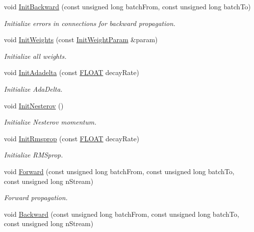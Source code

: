 \begin{DoxyCompactItemize}
void \hyperlink{classfractal_1_1Rnn_a7b6cce657b3a765903d4f90076555e5b}{Init\+Backward} (const unsigned long batch\+From, const unsigned long batch\+To)
\begin{DoxyCompactList}\small\item\em Initialize errors in connections for backward propagation. \end{DoxyCompactList}\item 
void \hyperlink{classfractal_1_1Rnn_afa174b5308bcc168f69dc62a0a3f8764}{Init\+Weights} (const \hyperlink{classfractal_1_1InitWeightParam}{Init\+Weight\+Param} \&param)
\begin{DoxyCompactList}\small\item\em Initialize all weights. \end{DoxyCompactList}\item 
void \hyperlink{classfractal_1_1Rnn_a267ef049cbe20675a8e38c72406db3d2}{Init\+Adadelta} (const \hyperlink{namespacefractal_a1c2d2530689575d5ccb56bae52af70d3}{F\+L\+O\+A\+T} decay\+Rate)
\begin{DoxyCompactList}\small\item\em Initialize Ada\+Delta. \end{DoxyCompactList}\item 
void \hyperlink{classfractal_1_1Rnn_ad8ccfbbadc57a8d69927b15596e91be0}{Init\+Nesterov} ()
\begin{DoxyCompactList}\small\item\em Initialize Nesterov momentum. \end{DoxyCompactList}\item 
void \hyperlink{classfractal_1_1Rnn_af8c861ddd6a937c03ed98f96583fa0a4}{Init\+Rmsprop} (const \hyperlink{namespacefractal_a1c2d2530689575d5ccb56bae52af70d3}{F\+L\+O\+A\+T} decay\+Rate)
\begin{DoxyCompactList}\small\item\em Initialize R\+M\+Sprop. \end{DoxyCompactList}\item 
void \hyperlink{classfractal_1_1Rnn_aec12209e9e2d9f47ee70eb714be32433}{Forward} (const unsigned long batch\+From, const unsigned long batch\+To, const unsigned long n\+Stream)
\begin{DoxyCompactList}\small\item\em Forward propagation. \end{DoxyCompactList}\item 
void \hyperlink{classfractal_1_1Rnn_ad0221aacc16940ec45bb5fef7a5106e5}{Backward} (const unsigned long batch\+From, const unsigned long batch\+To, const unsigned long n\+Stream)

\end{DoxyCompactItemize}

